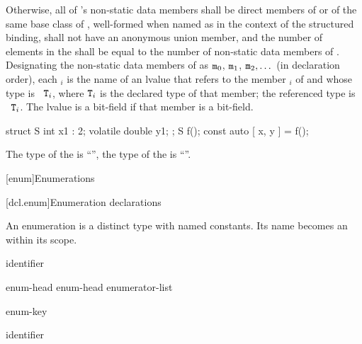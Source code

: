 \pnum
Otherwise,
all of 's non-static data members
shall be direct members of  or
of the same base class of ,
well-formed when named as 
in the context of the structured binding,
 shall not have an anonymous union member, and
the number of elements in the  shall be
equal to the number of non-static data members of .
Designating the non-static data members of  as
$\texttt{m}_0$, $\texttt{m}_1$, $\texttt{m}_2, \dotsc$
(in declaration order),
each $_i$ is the
name of an lvalue that refers to the member $_i$ of  and
whose type is \cv{}~$\texttt{T}_i$, where $\texttt{T}_i$ is the declared type of
that member; the referenced type is \cv{}~$\texttt{T}_i$. The lvalue is a
bit-field if that member is a bit-field.
\begin{example}
\begin{codeblock}
struct S { int x1 : 2; volatile double y1; };
S f();
const auto [ x, y ] = f();
\end{codeblock}
The type of the   is ``'',
the type of the   is ``''.
\end{example}

[enum]{Enumerations}%

[dcl.enum]{Enumeration declarations}%
%
%

\pnum
An enumeration is a distinct type with named
constants. Its name becomes an  within its scope.

\begin{bnf}
\br
    identifier
\end{bnf}

\begin{bnf}
\br
    enum-head \terminal{\{}  \terminal{\}}\br
    enum-head \terminal{\{} enumerator-list \terminal{,} \terminal{\}}
\end{bnf}

\begin{bnf}
\br
    enum-key   
\end{bnf}

\begin{bnf}
\br
     identifier
\end{bnf}

